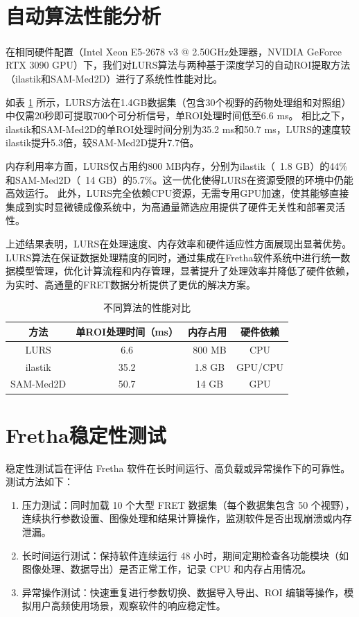\section{自动算法性能分析}
在相同硬件配置（Intel\textsuperscript{\textregistered} Xeon E5-2678 v3 @ 2.50GHz处理器，NVIDIA\textsuperscript{\textregistered} GeForce RTX 3090 GPU）下，我们对LURS算法与两种基于深度学习的自动ROI提取方法（ilastik和SAM-Med2D）进行了系统性性能对比。

如表 \ref{tab:性能对比} 所示，LURS方法在1.4GB数据集（包含30个视野的药物处理组和对照组）中仅需20秒即可提取700个可分析信号，单ROI处理时间低至6.6 ms。
相比之下，ilastik和SAM-Med2D的单ROI处理时间分别为35.2 ms和50.7 ms，LURS的速度较ilastik提升5.3倍，较SAM-Med2D提升7.7倍。  

内存利用率方面，LURS仅占用约800 MB内存，分别为ilastik（~1.8 GB）的44\%和SAM-Med2D（~14 GB）的5.7\%。这一优化使得LURS在资源受限的环境中仍能高效运行。
此外，LURS完全依赖CPU资源，无需专用GPU加速，使其能够直接集成到实时显微镜成像系统中，为高通量筛选应用提供了硬件无关性和部署灵活性。  

上述结果表明，LURS在处理速度、内存效率和硬件适应性方面展现出显著优势。LURS算法在保证数据处理精度的同时，通过集成在Fretha软件系统中进行统一数据模型管理，优化计算流程和内存管理，显著提升了处理效率并降低了硬件依赖，为实时、高通量的FRET数据分析提供了更优的解决方案。

\begin{table}[htbp]
    \centering
    \caption{不同算法的性能对比}
    \begin{tabular}{cccc}
    \toprule
    方法 & 单ROI处理时间（ms） & 内存占用 & 硬件依赖 \\
    \midrule
    LURS & 6.6 & ~800 MB & CPU \\
    ilastik & 35.2 & ~1.8 GB & GPU/CPU \\
    SAM-Med2D & 50.7 & ~14 GB & GPU \\
    \bottomrule
    \end{tabular}
    \label{tab:性能对比}
\end{table}

\section{Fretha稳定性测试}
稳定性测试旨在评估 Fretha 软件在长时间运行、高负载或异常操作下的可靠性。测试方法如下：
\begin{enumerate}
  \item 压力测试：同时加载 10 个大型 FRET 数据集（每个数据集包含 50 个视野），连续执行参数设置、图像处理和结果计算操作，监测软件是否出现崩溃或内存泄漏。
  \item 长时间运行测试：保持软件连续运行 48 小时，期间定期检查各功能模块（如图像处理、数据导出）是否正常工作，记录 CPU 和内存占用情况。
  \item 异常操作测试：快速重复进行参数切换、数据导入导出、ROI 编辑等操作，模拟用户高频使用场景，观察软件的响应稳定性。
\end{enumerate}

